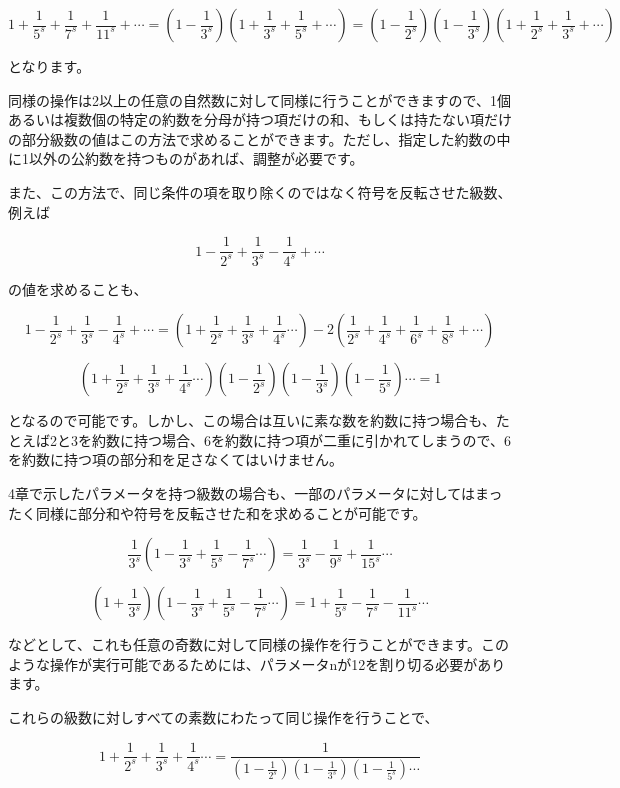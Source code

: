\documentclass[a4paper]{jsarticle}
\theoremstyle{break}
\begin{document}
\[1+\frac{1}{5^s}+\frac{1}{7^s}+\frac{1}{11^s}+\cdots=\left( 1-\frac{1}{3^s} \right)\left( 1+\frac{1}{3^s}+\frac{1}{5^s}+\cdots \right)=\left( 1-\frac{1}{2^s} \right)\left( 1-\frac{1}{3^s} \right)\left( 1+\frac{1}{2^s}+\frac{1}{3^s}+\cdots \right)\]

となります。

同様の操作は2以上の任意の自然数に対して同様に行うことができますので、1個あるいは複数個の特定の約数を分母が持つ項だけの和、もしくは持たない項だけの部分級数の値はこの方法で求めることができます。ただし、指定した約数の中に1以外の公約数を持つものがあれば、調整が必要です。

また、この方法で、同じ条件の項を取り除くのではなく符号を反転させた級数、例えば

\[1-\frac{1}{2^s}+\frac{1}{3^s}-\frac{1}{4^s}+\cdots\]

の値を求めることも、

\[1-\frac{1}{2^s}+\frac{1}{3^s}-\frac{1}{4^s}+\cdots= \left(1+\frac{1}{2^s}+\frac{1}{3^s}+\frac{1}{4^s}\cdots \right)-2\left(\frac{1}{2^s}+\frac{1}{4^s}+\frac{1}{6^s}+\frac{1}{8^s}+\cdots \right)\]

\[\left( 1+\frac{1}{2^s}+\frac{1}{3^s}+\frac{1}{4^s}\cdots \right)\left( 1-\frac{1}{2^s} \right)\left( 1-\frac{1}{3^s} \right)\left( 1-\frac{1}{5^s} \right)\cdots=1\]

となるので可能です。しかし、この場合は互いに素な数を約数に持つ場合も、たとえば2と3を約数に持つ場合、6を約数に持つ項が二重に引かれてしまうので、6を約数に持つ項の部分和を足さなくてはいけません。

4章で示したパラメータを持つ級数の場合も、一部のパラメータに対してはまったく同様に部分和や符号を反転させた和を求めることが可能です。

\[\frac{1}{3^s}\left(1-\frac{1}{3^s}+\frac{1}{5^s}-\frac{1}{7^s}\cdots\right)=\frac{1}{3^s}-\frac{1}{9^s}+\frac{1}{15^s}\cdots\]

\[\left( 1+\frac{1}{3^s} \right)\left( 1-\frac{1}{3^s}+\frac{1}{5^s}-\frac{1}{7^s}\cdots \right)=1+\frac{1}{5^s}-\frac{1}{7^s}-\frac{1}{11^s}\cdots\]

などとして、これも任意の奇数に対して同様の操作を行うことができます。このような操作が実行可能であるためには、パラメータnが12を割り切る必要があります。

これらの級数に対しすべての素数にわたって同じ操作を行うことで、

\[1+\frac{1}{2^s}+\frac{1}{3^s}+\frac{1}{4^s}\cdots =\frac{1}{\left( 1-\frac{1}{2^s} \right)\left( 1-\frac{1}{3^s} \right)\left( 1-\frac{1}{5^s} \right)\cdots}\]
\end{document}
